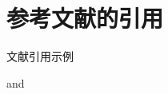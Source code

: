 \documentclass{ctexart}
\begin{document}


\section{参考文献的引用}\label{my label}

文献引用示例 \cite{Tadmor2012,Shen1994,CaiFuLiuWang2022}

\cite{Adams2003,Tadmor2012} and \cite{Shen1994}

\cite{ShiShi2013}



\end{document}
